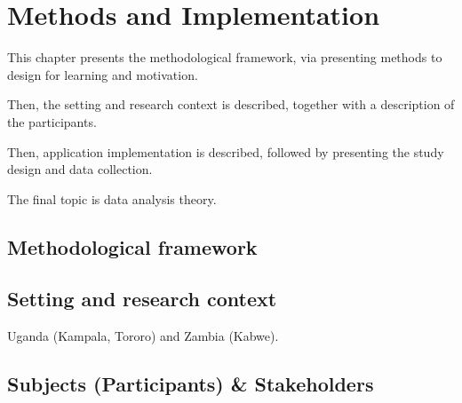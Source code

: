 \chapter{Methods and Implementation}\label{cha:Method}





This chapter presents the methodological framework, via presenting methods to design for learning and motivation.

Then, the setting and research context is described, together with a description of the participants.

Then, application implementation is described, followed by presenting the study design and data collection.

The final topic is data analysis theory.

\section{Methodological framework}





\section{Setting and research context}
Uganda (Kampala, Tororo) and Zambia (Kabwe).

\section{Subjects (Participants) \& Stakeholders}

